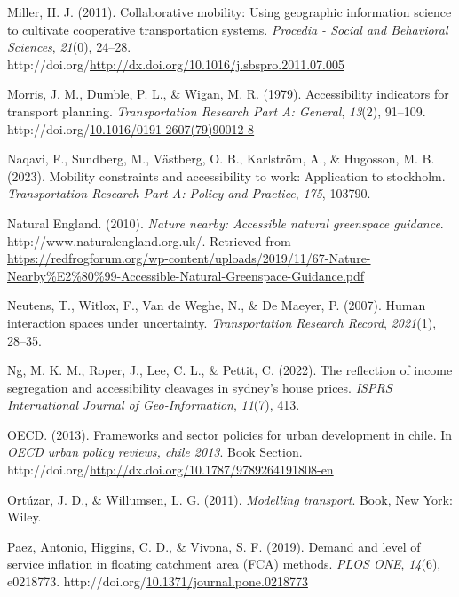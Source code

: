 \documentclass[
11pt, %
oneside, %
english, %
singlespacing, %
]{macthesis} %
\newlength{\cslhangindent}
\newenvironment{CSLReferences}[2] %
{\begin{list}{}{%
	\setlength{\itemindent}{0pt}
	\setlength{\leftmargin}{0pt}
	\setlength{\parsep}{0pt}
	\ifodd #1
	\setlength{\leftmargin}{\cslhangindent}
	\setlength{\itemindent}{-1\cslhangindent}
	\fi
	\setlength{\itemsep}{#2\baselineskip}}}
{\end{list}}
\begin{document}
\begin{CSLReferences}{1}{0}
Miller, H. J. (2011). Collaborative mobility: Using geographic information science to cultivate cooperative transportation systems. \emph{Procedia - Social and Behavioral Sciences}, \emph{21}(0), 24--28. http://doi.org/\url{http://dx.doi.org/10.1016/j.sbspro.2011.07.005}

Morris, J. M., Dumble, P. L., \& Wigan, M. R. (1979). Accessibility indicators for transport planning. \emph{Transportation Research Part A: General}, \emph{13}(2), 91--109. http://doi.org/\href{https://doi.org/10.1016/0191-2607(79)90012-8}{10.1016/0191-2607(79)90012-8}

Naqavi, F., Sundberg, M., Västberg, O. B., Karlström, A., \& Hugosson, M. B. (2023). Mobility constraints and accessibility to work: Application to stockholm. \emph{Transportation Research Part A: Policy and Practice}, \emph{175}, 103790.

Natural England. (2010). \emph{Nature nearby: Accessible natural greenspace guidance}. http://www.naturalengland.org.uk/. Retrieved from \url{https://redfrogforum.org/wp-content/uploads/2019/11/67-Nature-Nearby\%E2\%80\%99-Accessible-Natural-Greenspace-Guidance.pdf}

Neutens, T., Witlox, F., Van de Weghe, N., \& De Maeyer, P. (2007). Human interaction spaces under uncertainty. \emph{Transportation Research Record}, \emph{2021}(1), 28--35.

Ng, M. K. M., Roper, J., Lee, C. L., \& Pettit, C. (2022). The reflection of income segregation and accessibility cleavages in sydney's house prices. \emph{ISPRS International Journal of Geo-Information}, \emph{11}(7), 413.

OECD. (2013). Frameworks and sector policies for urban development in chile. In \emph{OECD urban policy reviews, chile 2013}. Book Section. http://doi.org/\url{http://dx.doi.org/10.1787/9789264191808-en}

Ortúzar, J. D., \& Willumsen, L. G. (2011). \emph{Modelling transport}. Book, New York: Wiley.

Paez, Antonio, Higgins, C. D., \& Vivona, S. F. (2019). Demand and level of service inflation in floating catchment area ({FCA}) methods. \emph{{PLOS} {ONE}}, \emph{14}(6), e0218773. http://doi.org/\href{https://doi.org/10.1371/journal.pone.0218773}{10.1371/journal.pone.0218773}


\end{CSLReferences}
\end{document}
